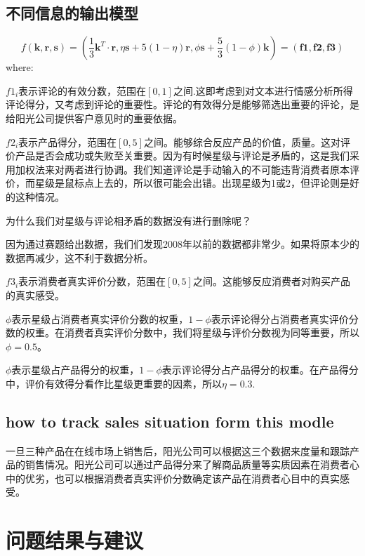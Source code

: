\documentclass[UTF8]{article}
\begin{document}
\subsection{不同信息的输出模型}
\begin{equation}\label{q1}
f(\boldsymbol{k},\boldsymbol{r},\boldsymbol{s})=(\frac{1}{3}\boldsymbol{k}^T\cdot \boldsymbol{r},\eta \boldsymbol{s} + 5(1-\eta)\boldsymbol{r},\phi\boldsymbol{s} + \frac{5}{3}(1-\phi)\boldsymbol{k})=(\boldsymbol{f1},\boldsymbol{f2},\boldsymbol{f3})
\end{equation}\label{zy1}
where:

$f1_i$表示评论的有效分数，范围在$[0,1]$之间.这即考虑到对文本进行情感分析所得评论得分，又考虑到评论的重要性。评论的有效得分是能够筛选出重要的评论，是给阳光公司提供客户意见时的重要依据。

$f2_i$表示产品得分，范围在$[0,5]$之间。能够综合反应产品的价值，质量。这对评价产品是否会成功或失败至关重要。因为有时候星级与评论是矛盾的，这是我们采用加权法来对两者进行协调。我们知道评论是手动输入的不可能违背消费者原本评价，而星级是鼠标点上去的，所以很可能会出错。出现星级为1或2，但评论则是好的这种情况。

为什么我们对星级与评论相矛盾的数据没有进行删除呢？

因为通过赛题给出数据，我们们发现2008年以前的数据都非常少。如果将原本少的数据再减少，这不利于数据分析。

$f3_i$表示消费者真实评价分数，范围在$[0,5]$之间。这能够反应消费者对购买产品的真实感受。

$\phi$表示星级占消费者真实评价分数的权重，$1-\phi$表示评论得分占消费者真实评价分数的权重。在消费者真实评价分数中，我们将星级与评价分数视为同等重要，所以$\phi=0.5$。

$\phi$表示星级占产品得分的权重，$1-\phi$表示评论得分占产品得分的权重。在产品得分中，评价有效得分看作比星级更重要的因素，所以$\eta=0.3$.

\subsection{how to track sales situation form this modle}
一旦三种产品在在线市场上销售后，阳光公司可以根据这三个数据来度量和跟踪产品的销售情况。阳光公司可以通过产品得分来了解商品质量等实质因素在消费者心中的优劣，也可以根据消费者真实评价分数确定该产品在消费者心目中的真实感受。

\section{问题结果与建议}
\end{document}
